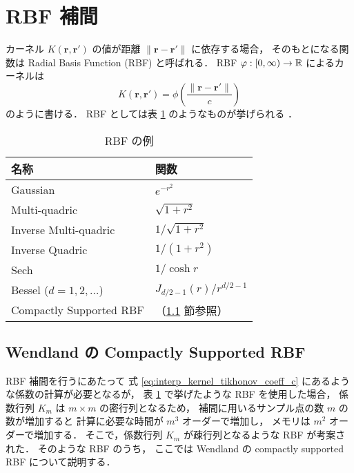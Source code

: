%

\section{RBF 補間}\label{sec:interp_kernel_rbf}

カーネル $K(\bm{r}, \bm{r}')$ の値が距離 $\|\bm{r} - \bm{r}'\|$ に依存する場合，
そのもとになる関数は Radial Basis Function (RBF) と呼ばれる．
RBF $\varphi : [0, \infty) \to \mathbb{R}$ によるカーネルは
\begin{equation}
    K(\bm{r}, \bm{r}') = \phi\left(\frac{\|\bm{r} - \bm{r}'\|}{c}\right)
    \label{eq:regularization_kernel_kernel-of-rbf}
\end{equation}
のように書ける．
RBF としては表
\ref{table:interp_kernel_example-rbfs}
のようなものが挙げられる
\cite{Brochu2010,Fornberg2015}．

\begin{table}[bp]
    \caption{RBF の例 \cite{Brochu2010,Fornberg2015}}
    \label{table:interp_kernel_example-rbfs}
    \centering
    \begin{tabular}{ll}
        名称                      & 関数                                  \\
        \hline
        Gaussian                & $e^{-r^2}$                          \\
        Multi-quadric           & $\sqrt{1 + r^2}$                    \\
        Inverse Multi-quadric   & $1/\sqrt{1 + r^2}$                  \\
        Inverse Quadric         & $1 / (1 + r^2)$                     \\
        Sech                    & $1 / \cosh{r}$                      \\
        Bessel ($d=1,2,\ldots$) & $J_{d/2-1}(r) / r^{d/2-1}$          \\
        Compactly Supported RBF & （\ref{sec:interp_kernel_csrbf} 節参照）
    \end{tabular}
\end{table}

\subsection{Wendland の Compactly Supported RBF}\label{sec:interp_kernel_csrbf}

RBF 補間を行うにあたって
式 \eqref{eq:interp_kernel_tikhonov_coeff_c} にあるような係数の計算が必要となるが，
表 \ref{table:interp_kernel_example-rbfs}
で挙げたような RBF を使用した場合，
係数行列 $K_m$ は $m \times m$ の密行列となるため，
補間に用いるサンプル点の数 $m$ の数が増加すると
計算に必要な時間が $m^3$ オーダーで増加し，
メモリは $m^2$ オーダーで増加する．
そこで，係数行列 $K_m$ が疎行列となるような RBF が考案された．
そのような RBF のうち，
ここでは Wendland の compactly supported RBF \cite{Wendland1995} について説明する．

